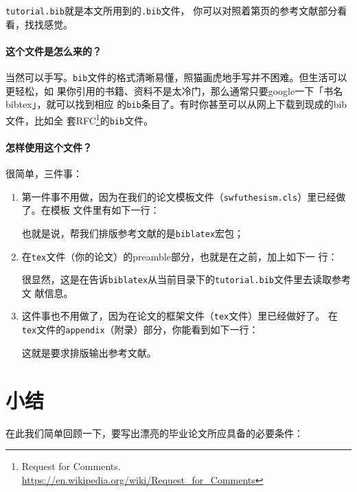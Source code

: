 \texttt{tutorial.bib}就是本文所用到的\texttt{.bib}文件，
你可以对照着第\pageref{p:ref}页的参考文献部分看看，找找感觉。

\paragraph*{这个文件是怎么来的？}

当然可以手写。\texttt{bib}文件的格式清晰易懂，照猫画虎地手写并不困难。但生活可以更轻松，如
果你引用的书籍、资料不是太冷门，那么通常只要google一下「书名 bibtex」，就可以找到相应
的\texttt{bib}条目了。有时你甚至可以从网上下载到现成的bib文件，比如全
套RFC\footnote{Request for
  Comments. \url{https://en.wikipedia.org/wiki/Request_for_Comments}}的\texttt{bib}文件。

\paragraph*{怎样使用这个文件？}

很简单，三件事：

\begin{enumerate}
\item 第一件事不用做，因为在我们的论文模板文件（\texttt{swfuthesism.cls}）里已经做了。在模板
  文件里有如下一行：
\begin{latexcode}
\RequirePackage[backend=biber,style=gb7714-2015]{biblatex}
\end{latexcode}
  也就是说，帮我们排版参考文献的是\texttt{biblatex}宏包；
\item 在\texttt{tex}文件（你的论文）的preamble部分，也就是在\ltx{\document}之前，加上如下一
  行：
\begin{latexcode}

\end{latexcode}
  很显然，这是在告诉\texttt{biblatex}从当前目录下的\texttt{tutorial.bib}文件里去读取参考文
  献信息。
\item 这件事也不用做了，因为在论文的框架文件（\texttt{tex}文件）里已经做好了。
  在\texttt{tex}文件的\texttt{appendix}（附录）部分，你能看到如下一行：
\begin{latexcode}
\makebib
\end{latexcode}
  这就是要求排版输出参考文献。
\end{enumerate}

\section{小结}

在此我们简单回顾一下，要写出漂亮的毕业论文所应具备的必要条件：

